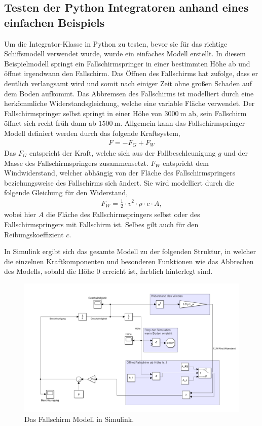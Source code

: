 \documentclass[]{iat}
\begin{document}
\subsection{Testen der Python Integratoren anhand eines einfachen Beispiels} \label{sec:integrator_test}
Um die Integrator-Klasse in Python zu testen, bevor sie für das richtige Schiffsmodell verwendet wurde, wurde ein einfaches Modell erstellt. In diesem Beispielmodell springt ein Fallschirmspringer in einer bestimmten Höhe ab und öffnet irgendwann den Fallschirm. Das Öffnen des Fallschirms hat zufolge, dass er deutlich verlangsamt wird und somit nach einiger Zeit ohne großen Schaden auf dem Boden aufkommt. Das Abbremsen des Fallschirms ist modelliert durch eine herkömmliche Widerstandsgleichung, welche eine variable Fläche verwendet. Der Fallschirmspringer selbst springt in einer Höhe von $\SI{3000}{\m}$ ab, sein Fallschirm öffnet sich recht früh dann ab $\SI{1500}{\m}$. Allgemein kann das Fallschirmspringer-Modell definiert werden durch das folgende Kraftsystem,
\begin{align}
    F = -F_G + F_W
\end{align}
Das $F_G$ entspricht der Kraft, welche sich aus der Fallbeschleunigung $g$ und der Masse des Fallschirmspringers zusammensetzt. $F_W$ entspricht dem Windwiderstand, welcher abhängig von der Fläche des Fallschirmspringers beziehungsweise des Fallschirms sich ändert. Sie wird modelliert durch die folgende Gleichung für den Widerstand,
\begin{align}
    F_W = \frac{1}{2} \cdot v^2 \cdot \rho \cdot c \cdot A,
\end{align}
wobei hier $A$ die Fläche des Fallschirmspringers selbst oder des Fallschirmspringers mit Fallschirm ist. Selbes gilt auch für den Reibungskoeffizient $c$.

In Simulink ergibt sich das gesamte Modell zu der folgenden Struktur, in welcher die einzelnen Kraftkomponenten und besonderen Funktionen wie das Abbrechen des Modells, sobald die Höhe 0 erreicht ist, farblich hinterlegt sind.

\begin{figure}[H]
    \includegraphics[width=\textwidth]{graphics/parachute_simulink.png}
    \centering
    \caption{Das Fallschirm Modell in Simulink.}
    \label{abb:parachute_simulink}
\end{figure}
\end{document}
